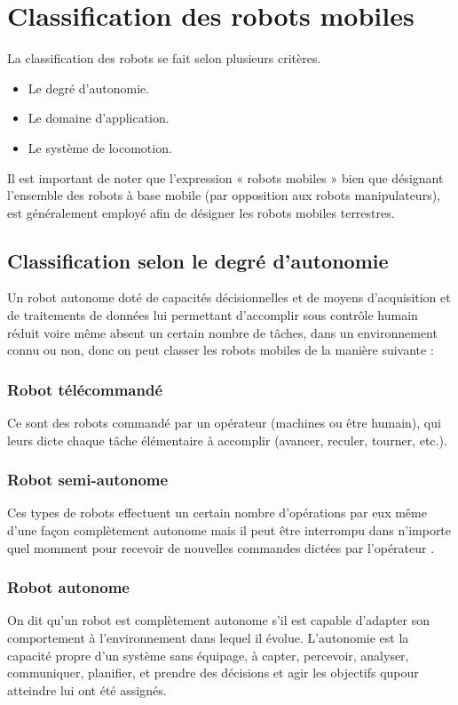 \section{Classification des robots mobiles}
La classification des robots se fait selon plusieurs critères.
 \begin{itemize}    
     \item Le degré d’autonomie.     
     \item Le domaine d’application.    
      \item  Le système de locomotion. 
\end{itemize}
\newpage
Il est important de noter que l’expression « robots mobiles » bien que désignant l’ensemble des robots à base mobile (par opposition aux robots manipulateurs), est généralement employé afin de désigner les robots mobiles terrestres.
\subsection{Classification selon le degré d'autonomie}
Un robot autonome  doté de capacités décisionnelles et de moyens d’acquisition et de traitements de données lui permettant d’accomplir sous contrôle humain réduit voire même absent un certain nombre de tâches, dans un environnement connu ou non, donc on peut classer les robots mobiles de la manière suivante :

\subsubsection{Robot télécommandé}
Ce sont des robots commandé par un opérateur (machines ou être humain), qui leurs dicte chaque tâche élémentaire à accomplir (avancer, reculer, tourner, etc.).
\subsubsection{Robot semi-autonome}
Ces types de robots effectuent un certain nombre d’opérations par eux même d’une façon complètement autonome mais il peut être interrompu dans n'importe quel momment pour recevoir de nouvelles commandes dictées par l'opérateur .

\subsubsection{Robot autonome}
On dit qu'un  robot est complètement autonome s’il est capable d’adapter son comportement à l’environnement dans lequel il évolue.
L’autonomie est la capacité propre d’un système sans équipage, à capter, percevoir, analyser, communiquer, planifier, et prendre des décisions et agir  les objectifs qupour atteindre lui ont été assignés.

